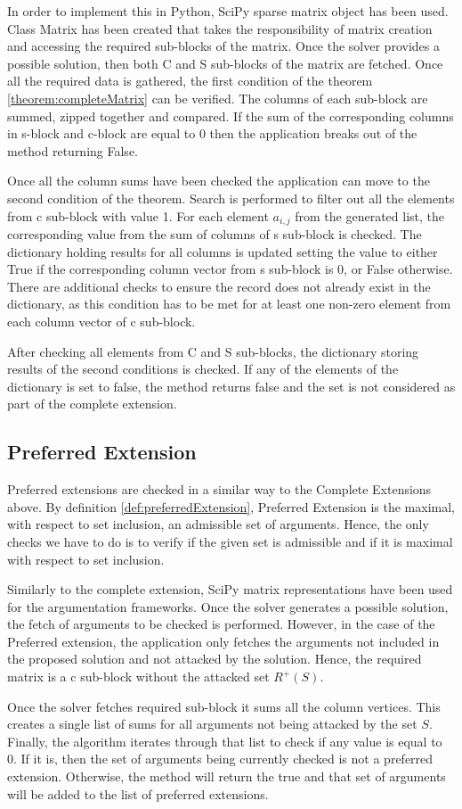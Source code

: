 In order to implement this in Python, SciPy \citep{jones2014scipy} sparse matrix object has been used. Class Matrix has been created that takes the responsibility of matrix creation and accessing the required sub-blocks of the matrix. Once the solver provides a possible solution, then both C and S sub-blocks of the matrix are fetched. Once all the required data is gathered, the first condition of the theorem \ref{theorem:completeMatrix} can be verified. The columns of each sub-block are summed, zipped together and compared. If the sum of the corresponding columns in s-block and c-block are equal to 0 then the application breaks out of the method returning False. 

Once all the column sums have been checked the application can move to the second condition of the theorem. Search is performed to filter out all the elements from c sub-block with value 1. For each element $a_{i,j}$ from the generated list, the corresponding value from the sum of columns of s sub-block is checked. The dictionary holding results for all columns is updated setting the value to either True if the corresponding column vector from s sub-block is 0, or False otherwise. There are additional checks to ensure the record does not already exist in the dictionary, as this condition has to be met for at least one non-zero element from each column vector of c sub-block.

After checking all elements from C and S sub-blocks, the dictionary storing results of the second conditions is checked. If any of the elements of the dictionary is set to false, the method returns false and the set is not considered as part of the complete extension. 

\subsection{Preferred Extension} \label{section:preferredExtension}
Preferred extensions are checked in a similar way to the Complete Extensions above. By definition \ref{def:preferredExtension}, Preferred Extension is the maximal, with respect to set inclusion, an admissible set of arguments. Hence, the only checks we have to do is to verify if the given set is admissible and if it is maximal with respect to set inclusion.

Similarly to the complete extension, SciPy matrix representations have been used for the argumentation frameworks. Once the solver generates a possible solution, the fetch of arguments to be checked is performed. However, in the case of the Preferred extension, the application only fetches the arguments not included in the proposed solution and not attacked by the solution. Hence, the required matrix is a c sub-block without the attacked set $R^+(S)$.
 
Once the solver fetches required sub-block it sums all the column vertices. This creates a single list of sums for all arguments not being attacked by the set $S$. Finally, the algorithm iterates through that list to check if any value is equal to 0. If it is, then the set of arguments being currently checked is not a preferred extension. Otherwise, the method will return the true and that set of arguments will be added to the list of preferred extensions.